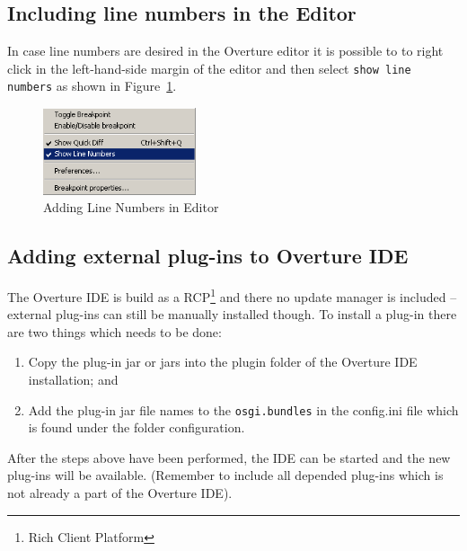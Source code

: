 \documentclass{overturerepchap}
\begin{document}
\subsection{Including line numbers in the Editor}

In case line numbers are desired in the Overture
editor it is possible to to right click in the left-hand-side margin
of the editor and then select \texttt{show line numbers} as shown in
Figure~\ref{fig:linenumbers}. 

\begin{figure}[!htb]
\begin{center}
\includegraphics[width=0.4\textwidth]{screenDumps/linenumbers}
\caption{Adding Line Numbers in Editor\label{fig:linenumbers}}
\end{center}
\end{figure}

\subsection{Adding external plug-ins to Overture IDE}

The Overture IDE is build as a RCP\footnote{Rich Client Platform} and
there no update manager is included -- external plug-ins can
still be manually installed though. To install a plug-in there are two
things which needs to be done:
\begin{enumerate}
\item Copy the plug-in jar or jars into the plugin folder of the Overture IDE installation; and
\item Add the plug-in jar file names to the \texttt{osgi.bundles} in the config.ini file which is found under the folder configuration.
\end{enumerate}

After the steps above have been performed, the IDE can be started and the new plug-ins will be available. (Remember to include all depended plug-ins which is not already a part of the Overture IDE).
\end{document}
